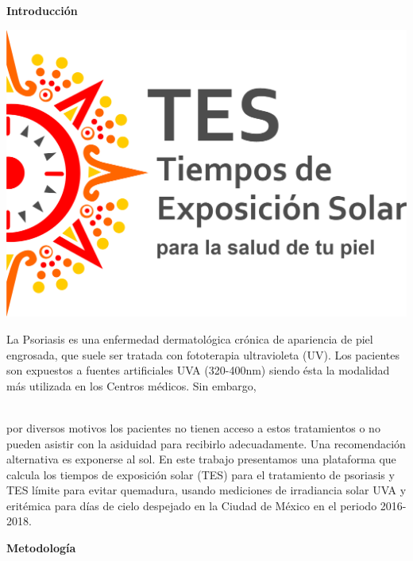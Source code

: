 \documentclass{article}
\begin{document}
\begin{multicols}{2}
\begin{center}
\begin{shaded}
\textbf{\textcolor{na}{Introducción}}
\end{shaded}
\end{center}
\begin{minipage}{0.4\linewidth}
\includegraphics[scale=0.38]{images/TES.png}
\end{minipage}
\begin{minipage}{0.6\linewidth}
La Psoriasis es una enfermedad dermatológica crónica de apariencia de piel engrosada, que suele ser 
tratada con fototerapia ultravioleta (UV). Los pacientes son expuestos a fuentes artificiales UVA (320-400nm) 
siendo ésta la modalidad más utilizada en los Centros médicos. Sin embargo,
\end{minipage} \vspace{-0.1cm}\\por diversos motivos los pacientes no tienen acceso a estos tratamientos o no pueden asistir con 
la asiduidad para recibirlo adecuadamente. Una recomendación alternativa es exponerse al sol. En este trabajo presentamos 
una plataforma que calcula los tiempos de exposición solar (TES) para el tratamiento de psoriasis y TES límite para evitar quemadura, usando mediciones de irradiancia solar 
UVA y eritémica para días de cielo despejado en la Ciudad de México en el periodo 2016-2018.
\begin{center}
\begin{shaded}
\textbf{\textcolor{na}{Metodología}}
\end{shaded}
\end{center}

\end{multicols}
\end{document}

